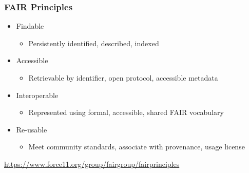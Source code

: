 \documentclass{beamer}
\begin{document}
\begin{frame}
  \frametitle{FAIR Principles}
  
  \begin{itemize}
  \item Findable
  \begin{itemize}
  \item Persistently identified, described, indexed
  \end{itemize}
  \item Accessible
  \begin{itemize}
  \item Retrievable by identifier, open protocol, accessible metadata
  \end{itemize}
  \item Interoperable
  \begin{itemize}
  \item Represented using formal, accessible, shared FAIR vocabulary
  \end{itemize}
  \item Re-usable
  \begin{itemize}
  \item Meet community standards, associate with provenance, usage license
  \end{itemize}
  \end{itemize}
  \tiny
  \begin{flushright}
  \url{https://www.force11.org/group/fairgroup/fairprinciples}
  \end{flushright}
\end{frame}

  
\end{document}
